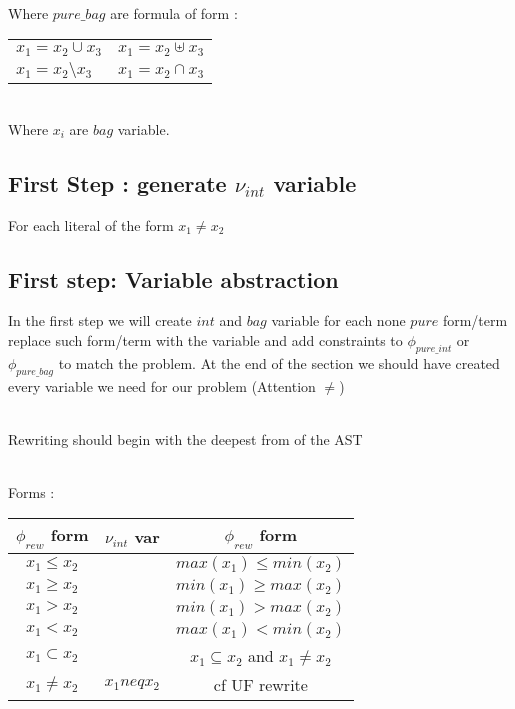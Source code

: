 \\Where $pure\_bag$ are formula of form :
\begin{tabular}{lr}
$x_{1} = x_{2} \cup x_{3}$ & $x_{1} = x_{2} \uplus x_{3}$ \\
$x_{1} = x_{2} \setminus x_{3}$ & $x_{1} = x_{2} \cap x_{3}$ \\
\end{tabular}
\\Where $x_{i}$ are $bag$ variable. 


\subsection{First Step : generate $\nu_{int}$ variable}
For each literal of the form $x_{1} \neq x_{2}$  

\subsection{First step: Variable abstraction}
In the first step we will create $int$ and $bag$ variable for each none $pure$ form/term
replace such form/term with the variable and add constraints to $\phi_{pure\_int}$ or $\phi_{pure\_bag}$
to match the problem.
At the end of the section we should have created every variable we need for our problem
(Attention $\neq$)

\\Rewriting should begin with the deepest from of the AST

\\Forms :
\\
\begin{tabular}{c|c|c}
$\phi_{rew}$ form & $\nu_{int}$ var & $\phi_{rew}$ form\\
\hline
$x_{1} \leq x_{2}$  && $max(x_{1}) \leq min(x_{2})$\\
$x_{1} \geq x_{2}$  && $min(x_{1}) \geq max(x_{2})$\\
$x_{1} > x_{2}$  && $min(x_{1}) > max(x_{2})$\\
$x_{1} < x_{2}$  && $max(x_{1}) < min(x_{2})$\\
$x_{1} \subset x_{2}$  && $x_{1} \subseteq x_{2}$ and $x_{1} \neq x_{2}$ \\
$x_{1} \neq x_{2}$ & $x_{1}neqx_{2}$ & cf UF rewrite\\

\end{tabular}

